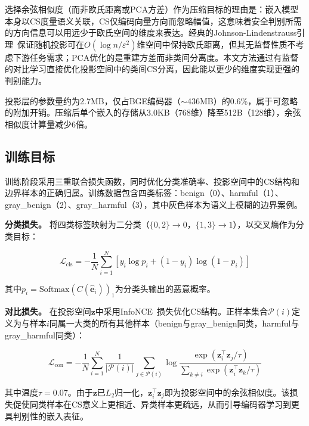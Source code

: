 选择余弦相似度（而非欧氏距离或PCA方差）作为压缩目标的理由是：嵌入模型本身以CS度量语义关联，CS仅编码向量方向而忽略幅值，这意味着安全判别所需的方向信息可以用远少于欧氏空间的维度来表达。经典的Johnson-Lindenstrauss引理~\cite{johnson1984extensions}保证随机投影可在$O(\log n / \varepsilon^2)$维空间中保持欧氏距离，但其无监督性质不考虑下游任务需求；PCA优化的是重建方差而非类间分离度。本文方法通过有监督的对比学习直接优化投影空间中的类间CS分离，因此能以更少的维度实现更强的判别能力。

投影层的参数量约为2.7MB，仅占BGE编码器（$\sim$436MB）的0.6\%，属于可忽略的附加开销。压缩后单个嵌入的存储从3.0KB（768维）降至512B（128维），余弦相似度计算量减少6倍。


\subsection{训练目标}

训练阶段采用三重联合损失函数，同时优化分类准确率、投影空间中的CS结构和边界样本的正确归属。训练数据包含四类标签：benign（0）、harmful（1）、gray\_benign（2）、gray\_harmful（3），其中灰色样本为语义上模糊的边界案例。

\textbf{分类损失。} 将四类标签映射为二分类（$\{0,2\} \rightarrow 0$，$\{1,3\} \rightarrow 1$），以交叉熵作为分类目标：

\begin{equation}
\mathcal{L}_{\text{cls}} = -\frac{1}{N} \sum_{i=1}^{N} \left[ y_i \log p_i + (1 - y_i) \log(1 - p_i) \right]
\label{eq:cls_loss}
\end{equation}

\noindent 其中$p_i = \text{Softmax}(C(\hat{\mathbf{e}}_i))_1$为分类头输出的恶意概率。

\textbf{对比损失。} 在投影空间$\mathbf{z}$中采用InfoNCE~\cite{oord2018representation}损失优化CS结构。正样本集合$\mathcal{P}(i)$定义为与样本$i$同属一大类的所有其他样本（benign与gray\_benign同类，harmful与gray\_harmful同类）：

\begin{equation}
\mathcal{L}_{\text{con}} = -\frac{1}{N} \sum_{i=1}^{N} \frac{1}{|\mathcal{P}(i)|} \sum_{j \in \mathcal{P}(i)} \log \frac{\exp(\mathbf{z}_i^\top \mathbf{z}_j / \tau)}{\sum_{k \neq i} \exp(\mathbf{z}_i^\top \mathbf{z}_k / \tau)}
\label{eq:con_loss}
\end{equation}

\noindent 其中温度$\tau = 0.07$。由于$\mathbf{z}$已$L_2$归一化，$\mathbf{z}_i^\top \mathbf{z}_j$即为投影空间中的余弦相似度。该损失促使同类样本在CS意义上更相近、异类样本更疏远，从而引导编码器学习到更具判别性的嵌入表征。


